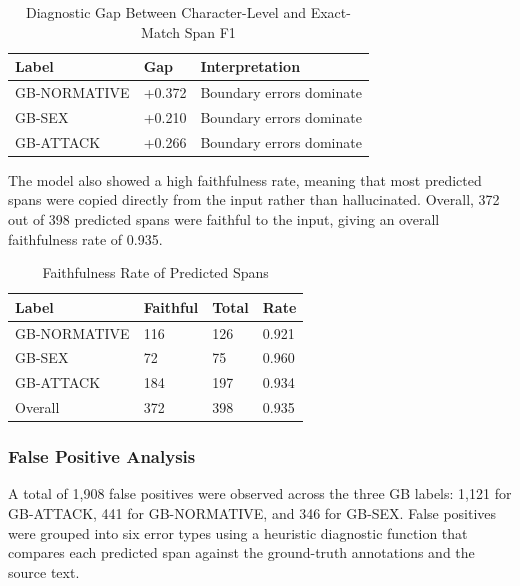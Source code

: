 \documentclass[12pt,oneside,openright,a4paper]{cpe-english-project}
\begin{document}
\begin{table}[H]
\centering
\small
\caption{Diagnostic Gap Between Character-Level and Exact-Match Span F1}
\begin{tabular}{@{}lll@{}}
\toprule
Label & Gap & Interpretation \\
\midrule
GB-NORMATIVE & +0.372 & Boundary errors dominate \\
GB-SEX & +0.210 & Boundary errors dominate \\
GB-ATTACK & +0.266 & Boundary errors dominate \\
\bottomrule
\end{tabular}
\end{table}

The model also showed a high faithfulness rate, meaning that most predicted spans were copied directly from the input rather than hallucinated. Overall, 372 out of 398 predicted spans were faithful to the input, giving an overall faithfulness rate of 0.935.

\begin{table}[H]
\centering
\small
\caption{Faithfulness Rate of Predicted Spans}
\begin{tabular}{@{}llll@{}}
\toprule
Label & Faithful & Total & Rate \\
\midrule
GB-NORMATIVE & 116 & 126 & 0.921 \\
GB-SEX & 72 & 75 & 0.960 \\
GB-ATTACK & 184 & 197 & 0.934 \\
Overall & 372 & 398 & 0.935 \\
\bottomrule
\end{tabular}
\end{table}

\subsubsection{False Positive Analysis}

A total of 1,908 false positives were observed across the three GB labels: 1,121 for GB-ATTACK, 441 for GB-NORMATIVE, and 346 for GB-SEX. False positives were grouped into six error types using a heuristic diagnostic function that compares each predicted span against the ground-truth annotations and the source text.
\end{document}

